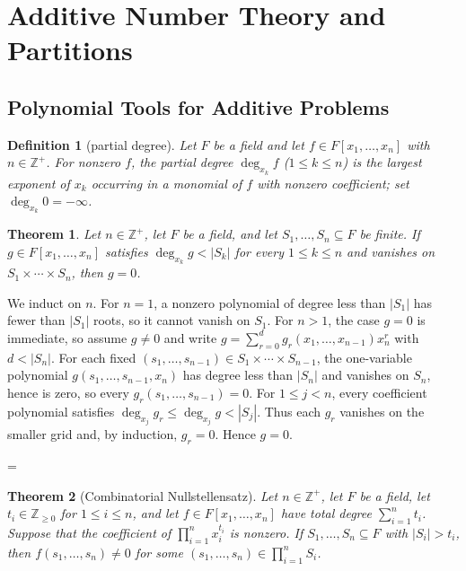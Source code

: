 \documentclass[11pt]{article}
\makeatletter
\theoremstyle{ntstyle}
\newtheorem{theorem}{Theorem}[subsection]
\newtheorem{definition}{Definition}[subsection]
\let\nt@closedisplay\]
\def\nt@guardedclose{\@ifnextchar\par{\nt@closeafterpar}{\@ifnextchar\end{\postdisplaypenalty\@M\nt@closedisplay}{\nt@closedisplay}}}
\def\nt@closeafterpar\par{\@ifnextchar\par{\nt@closeafterpar}{\@ifnextchar\end{\postdisplaypenalty\@M\nt@closedisplay\par}{\nt@closedisplay\par}}}
\renewenvironment{proof}[1][\proofname]{\par
  \pushQED{\qed}\normalfont\topsep\medskipamount\edef\nt@afterproof{\@endparpenalty=\the\@endparpenalty\relax}\@beginparpenalty\@M\@endparpenalty\@M\let\]\nt@guardedclose\trivlist\item[]\textit{#1\@addpunct{.}} \ignorespaces}{\ifvmode\addpenalty\@M\fi\popQED\nt@afterproof\endtrivlist\@endpefalse}
\makeatother
\begin{document}
\section{Additive Number Theory and Partitions}

\subsection{Polynomial Tools for Additive Problems}

\begin{definition}[partial degree]\label{def:12.1.1} Let $F$ be a field and let
	$f\in F[x_1,\ldots,x_n]$ with $n\in\mathbb{Z}^+$. For nonzero $f$, the
	partial degree $\deg_{x_k}f$ ($1\le k\le n$) is the largest exponent of
	$x_k$ occurring in a monomial of $f$ with nonzero coefficient; set
	$\deg_{x_k}0=-\infty$.

\end{definition}
\begin{theorem}\label{thm:12.1.1} Let $n\in\mathbb{Z}^+$, let $F$ be a
	field, and let $S_1,\ldots,S_n\subseteq F$ be finite. If
	$g\in F[x_1,\ldots,x_n]$ satisfies $\deg_{x_k}g<|S_k|$ for every
	$1\le k\le n$ and vanishes on $S_1\times\cdots\times S_n$, then $g=0$.

\end{theorem}

\begin{proof} We induct on $n$. For $n=1$, a nonzero
	polynomial of degree less than $|S_1|$ has fewer than $|S_1|$ roots, so it cannot
	vanish on $S_1$. For $n>1$, the case $g=0$ is immediate, so assume
	$g\neq0$ and write
	$g=\sum_{r=0}^{d}g_r(x_1,\ldots,x_{n-1})x_n^{r}$ with $d<|S_n|$. For
	each fixed $(s_1,\ldots,s_{n-1})\in S_1\times\cdots\times S_{n-1}$,
	the one-variable polynomial $g(s_1,\ldots,s_{n-1},x_n)$ has degree less than $|S_n|$ and
	vanishes on $S_n$, hence is zero, so every
	$g_r(s_1,\ldots,s_{n-1})=0$. For $1\le j<n$, every coefficient
	polynomial satisfies $\deg_{x_j}g_r\le\deg_{x_j}g<|S_j|$. Thus each
	$g_r$ vanishes on the smaller grid and, by induction, $g_r=0$. Hence
	$g=0$.

\end{proof}
\begin{theorem}[Combinatorial Nullstellensatz]\label{thm:12.1.2} Let
	$n\in\mathbb{Z}^+$, let $F$ be a field, let
	$t_i\in\mathbb{Z}_{\ge0}$ for $1\le i\le n$, and let
	$f\in F[x_1,\ldots,x_n]$ have total degree
	$\sum_{i=1}^n t_i$. Suppose that the coefficient of $\prod_{i=1}^{n}x_i^{t_i}$
	is nonzero. If $S_1,\ldots,S_n\subseteq F$ with $|S_i| > t_i$, then
	$f(s_1,\ldots,s_n)\neq0$ for some
	$(s_1,\ldots,s_n)\in\prod_{i=1}^{n}S_i$.

\end{theorem}
\end{document}
